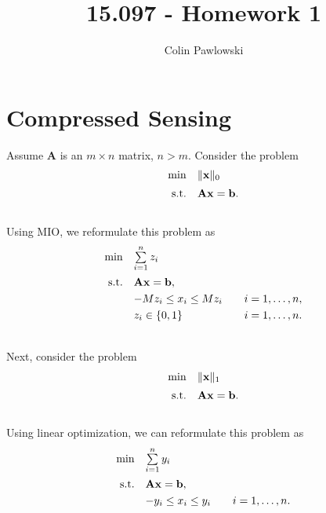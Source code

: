 \documentclass[12pt]{article}
\newcommand{\M}{\mathbf}
\newcommand{\1}{\mathds{1}}
\begin{document}
\title{15.097 - Homework 1}
 
\author{Colin Pawlowski}
\maketitle

\section{Compressed Sensing}
Assume $\M A$ is an $m \times n$ matrix, $n > m$.  Consider the problem
\begin{equation}
\begin{array}{rll}
  \min & \|\M x\|_0 \vspace{5pt}\\
  \text{s.t.} & \M{Ax = b}.
\end{array}
\end{equation}\\
%
Using MIO, we reformulate this problem as
\begin{equation}
\label{eq1:MIO}
\begin{array}{rll}
  \min & \sum \limits_{i=1}^n z_i \vspace{5pt}\\
  \text{s.t.} & \M{Ax = b},  \vspace{3pt}\\
  & -Mz_i \le x_i \le Mz_i &~~~i=1,\ldots,n, \vspace{3pt}\\
  & z_i \in \{0,1\} &~~~i=1,\ldots,n. \vspace{3pt}\\
\end{array}
\end{equation}\\
%
Next, consider the problem
\begin{equation}
\begin{array}{rll}
  \min & \|\M x\|_1 \vspace{5pt}\\
  \text{s.t.} & \M{Ax = b}.
\end{array}
\end{equation}\\
%
Using linear optimization, we can reformulate this problem as
\begin{equation}
\label{eq1:LO}
\begin{array}{rll}
  \min & \sum \limits_{i=1}^n y_i \vspace{5pt}\\
  \text{s.t.} & \M{Ax = b},  \vspace{3pt}\\
  & -y_i \le x_i \le y_i &~~~i=1,\ldots,n. \vspace{3pt}\\
\end{array}
\end{equation}\\
\end{document}
